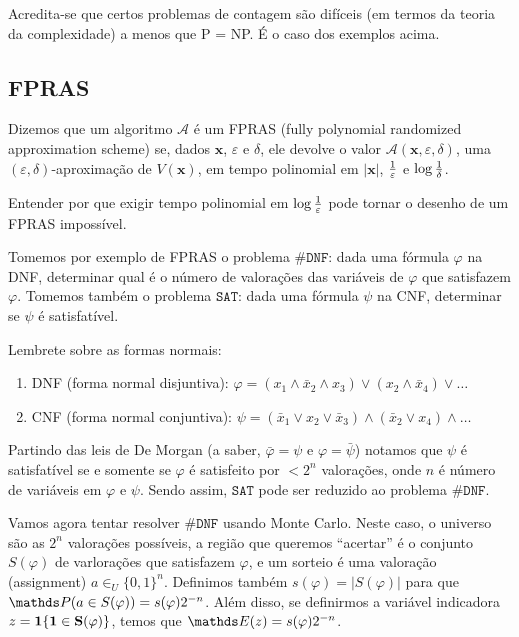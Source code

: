 Acredita-se que certos problemas de contagem são difíceis (em termos da teoria da complexidade) a menos que P = NP. É o caso dos exemplos acima.

\subsection{FPRAS}

\begin{definicao}
Dizemos que um algoritmo $\mathscr{A}$ é um FPRAS (fully polynomial randomized approximation scheme) se, dados $\mathbf{x}$, $\varepsilon$ e $\delta$, ele devolve o valor $\mathscr{A}(\mathbf{x}, \varepsilon, \delta)$, uma $(\varepsilon, \delta)$-aproximação de $V(\mathbf{x})$, em tempo polinomial em $|\mathbf{x}|$, ${1 \over \varepsilon}$ e $\log {1 \over \delta}$.
\end{definicao}

\begin{exercicio}
Entender por que exigir tempo polinomial em $\log {1 \over \varepsilon}$ pode tornar o desenho de um FPRAS impossível.
\end{exercicio}

Tomemos por exemplo de FPRAS o problema $\mathtt{\#DNF}$: dada uma fórmula $\varphi$ na DNF, determinar qual é o número de valorações das variáveis de $\varphi$ que satisfazem $\varphi$. Tomemos também o problema $\mathtt{SAT}$: dada uma fórmula $\psi$ na CNF, determinar se $\psi$ é satisfatível.

\begin{observacao}
Lembrete sobre as formas normais:
\begin{enumerate}
\item DNF (forma normal disjuntiva): $\varphi = (x_1 \wedge \bar x_2 \wedge x_3) \vee (x_2 \wedge \bar x_4) \vee \dots$
\item CNF (forma normal conjuntiva): $\psi = (\bar x_1 \vee x_2 \vee \bar x_3) \wedge (\bar x_2 \vee x_4) \wedge \dots$
\end{enumerate}
\end{observacao}

Partindo das leis de De Morgan (a saber, $\bar \varphi = \psi$ e $\varphi = \bar \psi$) notamos que $\psi$ é satisfatível se e somente se $\varphi$ é satisfeito por $< 2^n$ valorações, onde $n$ é número de variáveis em $\varphi$ e $\psi$. Sendo assim, $\mathtt{SAT}$ pode ser reduzido ao problema $\mathtt{\#DNF}$.

Vamos agora tentar resolver $\mathtt{\#DNF}$ usando Monte Carlo. Neste caso, o universo são as $2^n$ valorações possíveis, a região que queremos “acertar” é o conjunto $S(\varphi)$ de varlorações que satisfazem $\varphi$, e um sorteio é uma valoração (assignment) $a \in_U \{0, 1\}^n$. Definimos também $s(\varphi) = |S(\varphi)|$ para que $\PP(a \in S(\varphi)) = s(\varphi)2^{-n}$. Além disso, se definirmos a variável indicadora $z = \mathbbm{1}\{1 \in S(\varphi)\}$, temos que $\EE(z) = s(\varphi)2^{-n}$.

